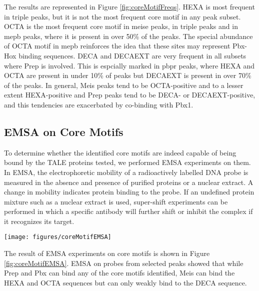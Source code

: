 The results are represented in Figure \ref{fig:coreMotifFreqs}. \ac{HEXA} is most frequent in triple peaks, but it is not the most frequent core motif in any peak subset. \ac{OCTA} is the most frequent core motif in \ac{meise} peaks, in triple peaks and in \ac{mepb} peaks, where it is present in over 50\% of the peaks. The special abundance of OCTA motif in \ac{mepb} reinforces the idea that these sites may represent Pbx-Hox binding sequences.  \ac{DECA} and \ac{DECAEXT} are very frequent in all subsets where Prep is involved. This is espcially marked in \ac{pbpr} peaks, where \ac{HEXA} and \ac{OCTA} are present in under 10\% of peaks but  \ac{DECAEXT} is present in over 70\% of the peaks. In general, Meis peaks tend to be \ac{OCTA}-positive and to a lesser extent \ac{HEXA}-positive and Prep peaks tend to be \ac{DECA}- or \ac{DECAEXT}-positive, and this tendencies are exacerbated by co-binding with Pbx1. 

\subsection{EMSA on Core Motifs}

To determine whether the identified core motifs are indeed capable of being bound by the \ac{TALE} proteins tested, we performed \ac{EMSA} experiments on them. In \ac{EMSA}, the electrophoretic mobility of a radioactively labelled DNA probe is measured in the absence and presence of purified proteins or a nuclear extract. A change in mobility indicates protein binding to the probe. If an undefined protein mixture such as a nuclear extract is used, super-shift experiments can be performed in which a specific antibody will further shift or inhibit the complex if it recognizes its target.

\begin{SCfigure}[]
  \centering
  \texttt{[image: figures/coreMotifEMSA]}
  \caption[EMSA Experiments on Core Motifs]{\textbf{EMSA Experiments on Core Motifs.} leyenda leyenda leyenda leyenda leyenda leyenda leyenda leyenda leyenda leyenda leyenda leyenda leyenda leyenda leyenda}
  \label{fig:coreMotifEMSA}
\end{SCfigure}

The result of \ac{EMSA} experiments on core motifs is shown in Figure \ref{fig:coreMotifEMSA}. \ac{EMSA} on probes from selected peaks showed that while Prep and Pbx can bind any of the core motifs identified, Meis can bind the HEXA and OCTA sequences but can only weakly bind to the DECA sequence.

